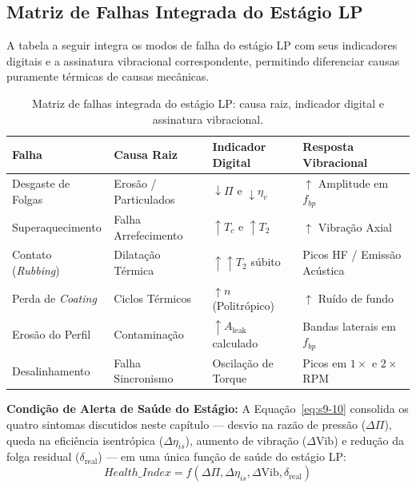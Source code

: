 \documentclass[12pt,a4paper]{article}
\numberwithin{equation}{section}
\numberwithin{table}{section}
\numberwithin{figure}{section}
\begin{document}
	\subsection{\textbf{Matriz de Falhas Integrada do Estágio LP}}
	A tabela a seguir integra os modos de falha do estágio LP com seus indicadores digitais e a assinatura vibracional correspondente, permitindo diferenciar causas puramente térmicas de causas mecânicas.
	\begin{table}[h!]
		\centering
		\small
		\renewcommand{\arraystretch}{1.5}
		\begin{tabular}{|l|l|l|l|}
			\hline
			\textbf{Falha} & \textbf{Causa Raiz} & \textbf{Indicador Digital} & \textbf{Resposta Vibracional} \\ \hline
			Desgaste de Folgas & Erosão / Particulados & $\downarrow \Pi$ e $\downarrow \eta_v$ & $\uparrow$ Amplitude em $f_{bp}$ \\ \hline
			Superaquecimento & Falha Arrefecimento & $\uparrow T_c$ e $\uparrow T_2$ & $\uparrow$ Vibração Axial \\ \hline
			Contato (\textit{Rubbing}) & Dilatação Térmica & $\uparrow \uparrow T_2$ súbito & Picos HF / Emissão Acústica \\ \hline
			Perda de \textit{Coating} & Ciclos Térmicos & $\uparrow n$ (Politrópico) & $\uparrow$ Ruído de fundo \\ \hline
			Erosão do Perfil & Contaminação & $\uparrow A_{\text{leak}}$ calculado & Bandas laterais em $f_{bp}$ \\ \hline
			Desalinhamento & Falha Sincronismo & Oscilação de Torque & Picos em $1 \times$ e $2 \times$ RPM \\ \hline
		\end{tabular}
		\caption{Matriz de falhas integrada do estágio LP: causa raiz, indicador digital e assinatura vibracional.}
	\end{table}
	
	\vspace{1em}
	\textbf{Condição de Alerta de Saúde do Estágio:} A Equação~\eqref{eq:s9-10} consolida os quatro sintomas discutidos neste capítulo — desvio na razão de pressão ($\Delta\Pi$), queda na eficiência isentrópica ($\Delta\eta_{is}$), aumento de vibração ($\Delta\text{Vib}$) e redução da folga residual ($\delta_{\text{real}}$) — em uma única função de saúde do estágio LP:
	\begin{equation}\label{eq:s9-10}
 \boxed{Health\_Index = f(\Delta \Pi, \Delta \eta_{is}, \Delta \text{Vib}, \delta_{\text{real}})}
\end{equation}
\end{document}
